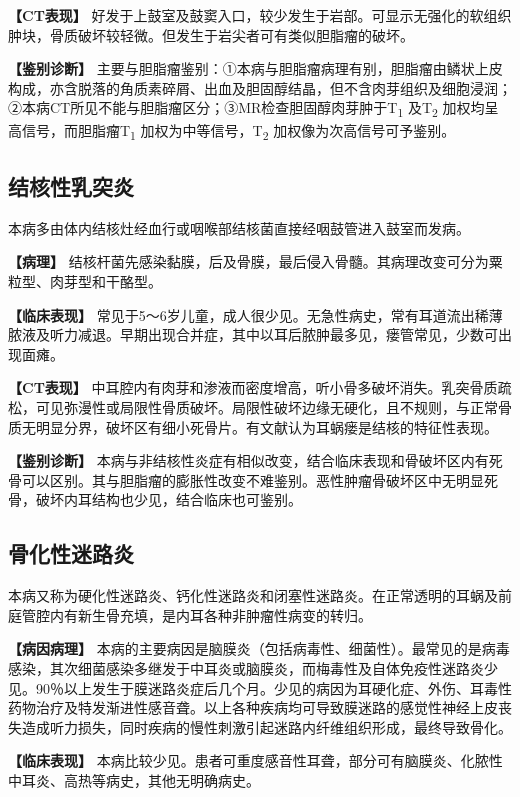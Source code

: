 \textbf{【CT表现】}
好发于上鼓室及鼓窦入口，较少发生于岩部。可显示无强化的软组织肿块，骨质破坏较轻微。但发生于岩尖者可有类似胆脂瘤的破坏。

\textbf{【鉴别诊断】}
主要与胆脂瘤鉴别：①本病与胆脂瘤病理有别，胆脂瘤由鳞状上皮构成，亦含脱落的角质素碎屑、出血及胆固醇结晶，但不含肉芽组织及细胞浸润；②本病CT所见不能与胆脂瘤区分；③MR检查胆固醇肉芽肿于T\textsubscript{1}
及T\textsubscript{2} 加权均呈高信号，而胆脂瘤T\textsubscript{1}
加权为中等信号，T\textsubscript{2} 加权像为次高信号可予鉴别。

\subsection{结核性乳突炎}

本病多由体内结核灶经血行或咽喉部结核菌直接经咽鼓管进入鼓室而发病。

\textbf{【病理】}
结核杆菌先感染黏膜，后及骨膜，最后侵入骨髓。其病理改变可分为粟粒型、肉芽型和干酪型。

\textbf{【临床表现】}
常见于5～6岁儿童，成人很少见。无急性病史，常有耳道流出稀薄脓液及听力减退。早期出现合并症，其中以耳后脓肿最多见，瘘管常见，少数可出现面瘫。

\textbf{【CT表现】}
中耳腔内有肉芽和渗液而密度增高，听小骨多破坏消失。乳突骨质疏松，可见弥漫性或局限性骨质破坏。局限性破坏边缘无硬化，且不规则，与正常骨质无明显分界，破坏区有细小死骨片。有文献认为耳蜗瘘是结核的特征性表现。

\textbf{【鉴别诊断】}
本病与非结核性炎症有相似改变，结合临床表现和骨破坏区内有死骨可以区别。其与胆脂瘤的膨胀性改变不难鉴别。恶性肿瘤骨破坏区中无明显死骨，破坏内耳结构也少见，结合临床也可鉴别。

\subsection{骨化性迷路炎}

本病又称为硬化性迷路炎、钙化性迷路炎和闭塞性迷路炎。在正常透明的耳蜗及前庭管腔内有新生骨充填，是内耳各种非肿瘤性病变的转归。

\textbf{【病因病理】}
本病的主要病因是脑膜炎（包括病毒性、细菌性）。最常见的是病毒感染，其次细菌感染多继发于中耳炎或脑膜炎，而梅毒性及自体免疫性迷路炎少见。90％以上发生于膜迷路炎症后几个月。少见的病因为耳硬化症、外伤、耳毒性药物治疗及特发渐进性感音聋。以上各种疾病均可导致膜迷路的感觉性神经上皮丧失造成听力损失，同时疾病的慢性刺激引起迷路内纤维组织形成，最终导致骨化。

\textbf{【临床表现】}
本病比较少见。患者可重度感音性耳聋，部分可有脑膜炎、化脓性中耳炎、高热等病史，其他无明确病史。

